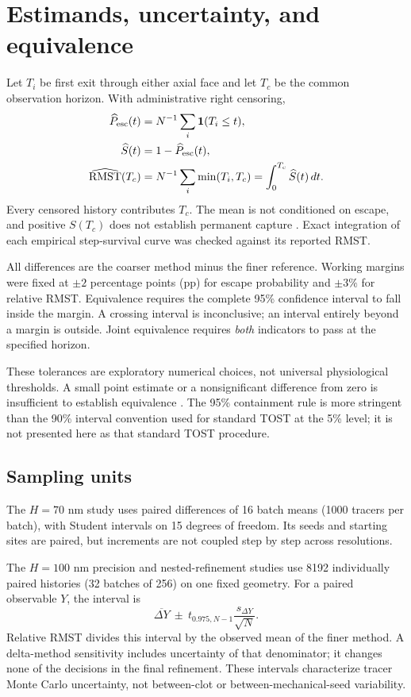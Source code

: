 \documentclass[a4paper,10pt]{article}
\numberwithin{equation}{section}
\begin{document}
\section{Estimands, uncertainty, and equivalence}
Let $T_i$ be first exit through either axial face and let $T_c$ be the common observation horizon. With administrative right censoring,
\begin{align}
\widehat P_{\rm esc}(t)&=N^{-1}\sum_i\mathbf 1(T_i\le t),\\
\widehat S(t)&=1-\widehat P_{\rm esc}(t),\\
\widehat{\mathrm{RMST}}(T_c)&=N^{-1}\sum_i\min(T_i,T_c)
=\int_0^{T_c}\widehat S(t)\,dt .
\end{align}
Every censored history contributes $T_c$. The mean is not conditioned on escape, and positive $S(T_c)$ does not establish permanent capture \cite{Redner2001,RoystonParmar2013}. Exact integration of each empirical step-survival curve was checked against its reported RMST.

All differences are the coarser method minus the finer reference. Working margins were fixed at $\pm2$ percentage points (pp) for escape probability and $\pm3\%$ for relative RMST. Equivalence requires the complete 95\% confidence interval to fall inside the margin. A crossing interval is inconclusive; an interval entirely beyond a margin is outside. Joint equivalence requires \emph{both} indicators to pass at the specified horizon.

These tolerances are exploratory numerical choices, not universal physiological thresholds. A small point estimate or a nonsignificant difference from zero is insufficient to establish equivalence \cite{Lakens2017}. The 95\% containment rule is more stringent than the 90\% interval convention used for standard TOST at the 5\% level; it is not presented here as that standard TOST procedure.

\subsection*{Sampling units}
The $H=70$ nm study uses paired differences of 16 batch means (1000 tracers per batch), with Student intervals on 15 degrees of freedom. Its seeds and starting sites are paired, but increments are not coupled step by step across resolutions.

The $H=100$ nm precision and nested-refinement studies use 8192 individually paired histories (32 batches of 256) on one fixed geometry. For a paired observable $Y$, the interval is
\begin{equation}
\overline{\Delta Y}\ \pm\ t_{0.975,N-1}
\frac{s_{\Delta Y}}{\sqrt N}.
\end{equation}
Relative RMST divides this interval by the observed mean of the finer method. A delta-method sensitivity includes uncertainty of that denominator; it changes none of the decisions in the final refinement. These intervals characterize tracer Monte Carlo uncertainty, not between-clot or between-mechanical-seed variability.
\end{document}
